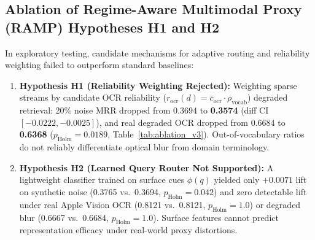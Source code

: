 \subsection{Ablation of Regime-Aware Multimodal Proxy (RAMP) Hypotheses H1 and H2}
In exploratory testing, candidate mechanisms for adaptive routing and reliability weighting failed to outperform standard baselines:
\begin{enumerate}
    \setlength{\itemsep}{0.2pt plus 0.1pt}
    \setlength{\parskip}{0pt}
    \item \textbf{Hypothesis H1 (Reliability Weighting Rejected):} Weighting sparse streams by candidate OCR reliability ($r_{\text{ocr}}(d) = \bar{c}_{\text{ocr}} \cdot \rho_{\text{vocab}}$) degraded retrieval: 20\% noise MRR dropped from 0.3694 to \textbf{0.3574} (diff CI $[-0.0222, -0.0025]$), and real degraded OCR dropped from 0.6684 to \textbf{0.6368} ($p_{\text{Holm}} = 0.0189$, Table~\ref{tab:ablation_v3}). Out-of-vocabulary ratios do not reliably differentiate optical blur from domain terminology.
    \item \textbf{Hypothesis H2 (Learned Query Router Not Supported):} A lightweight classifier trained on surface cues $\phi(q)$ yielded only $+0.0071$ lift on synthetic noise (0.3765 vs.\ 0.3694, $p_{\text{Holm}}=0.042$) and zero detectable lift under real Apple Vision OCR (0.8121 vs.\ 0.8121, $p_{\text{Holm}}=1.0$) or degraded blur (0.6667 vs.\ 0.6684, $p_{\text{Holm}}=1.0$). Surface features cannot predict representation efficacy under real-world proxy distortions.
\end{enumerate}

